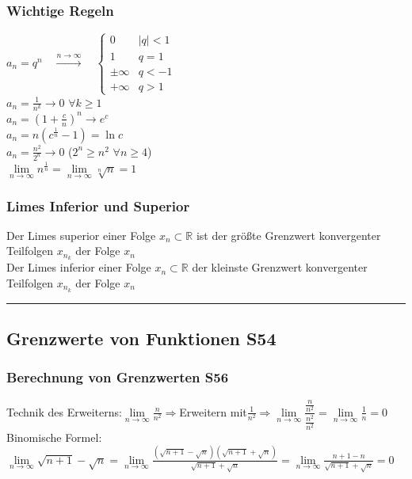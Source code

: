 \documentclass[6pt,a4paper]{scrartcl}
\newcommand{\ra}[0]{\ensuremath{\rightarrow}}
\begin{document}
\begin{multicols*}{2}
\subsubsection{Wichtige Regeln}
$a_n=q^n \quad \overset{n \rightarrow \infty}{\longrightarrow} \quad \begin{cases} 0 & |q|<1 \\ 1 & q=1 \\ \pm \infty & q < -1  \\  + \infty & q > 1\end{cases}$ \\
$a_n=\frac{1}{n^k}\rightarrow 0$ \qquad $\forall k \ge 1$\\
$a_n=\left(1+\frac{c}{n}\right)^n \rightarrow e^c$ \\
$a_n=n\left(c^{\frac1{n}}-1\right) = \ln c$\\
$a_n=\frac{n^2}{2^n}\ra 0$ \qquad \qquad \qquad ($2^n \ge n^2$ \quad $\forall n\ge 4$) \\
$\lim\limits_{n\to\infty}n^{\frac{1}{n}}=\lim\limits_{n\to\infty}\sqrt[n]{n}=1$


\subsubsection{Limes Inferior und Superior}
Der Limes superior einer Folge $x_n \subset \mathbb{R}$ ist der größte Grenzwert konvergenter Teilfolgen $x_{n_k}$ der Folge ${x_n}$ \\
Der Limes inferior einer Folge $x_n \subset \mathbb{R}$ der kleinste Grenzwert konvergenter Teilfolgen $x_{n_k}$ der Folge $x_n$
\hrule
\subsection{Grenzwerte von Funktionen \color{red} S54}
\subsubsection{Berechnung von Grenzwerten \color{red}S56} 
Technik des Erweiterns:$\lim\limits_{n\to \infty} \frac{n}{n^{2}}\Rightarrow $Erweitern mit$\frac{1}{n^{2}} \Rightarrow \lim\limits_{n\to \infty} \dfrac{\frac{n}{n^{2}}}{\frac{n^{2}}{n^{2}}} =\lim\limits_{n\to \infty}\frac{1}{n}=0$\\
Binomische Formel: $ \lim\limits_{n\to \infty}\sqrt{n+1}-\sqrt{n}= \lim\limits_{n\to \infty}\frac{(\sqrt{n+1}-\sqrt{n})(\sqrt{n+1}+\sqrt{n})}{\sqrt{n+1}+\sqrt{n}}=  
\lim\limits_{n\to \infty}\frac{n+1-n}{\sqrt{n+1}+\sqrt{n}}= 0$


\end{multicols*}
\end{document}

